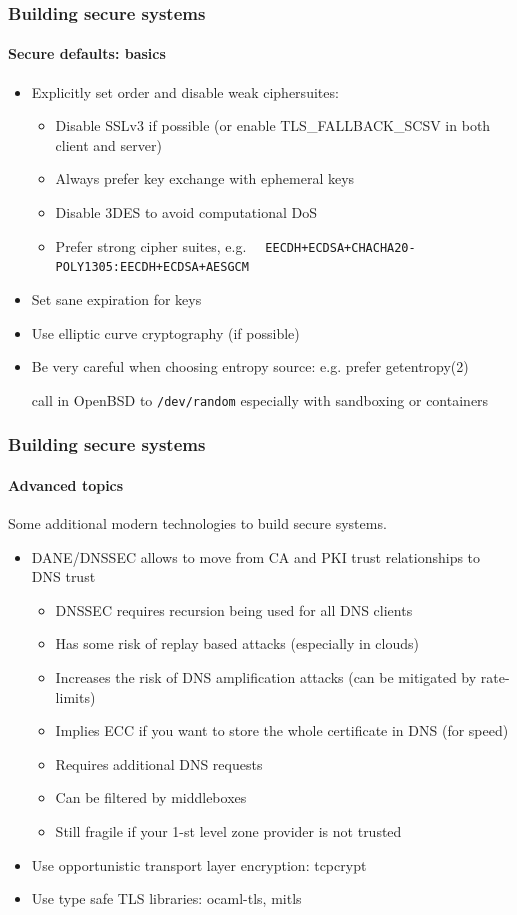 \documentclass[11pt,t]{beamer}
\newcommand{\funcname}[1]{
	{\color{yellow!30} #1}
}
\newcommand{\cipher}[1]{
	{\color{blue!30} #1}
}
\begin{document}
\begin{frame}[fragile]
\frametitle{Building secure systems}
\framesubtitle{Secure defaults: basics}
\begin{itemize}
\item Explicitly set order and disable weak ciphersuites:
	\begin{itemize}
	\item Disable SSLv3 if possible (or enable \funcname{TLS\_FALLBACK\_SCSV} in both 
	client and server)
	\item Always prefer key exchange with ephemeral keys
	\item Disable 3DES to avoid computational DoS
	\item Prefer strong cipher suites, e.g. 
	{\scriptsize 
	\texttt{\cipher{EECDH+ECDSA+CHACHA20-POLY1305:EECDH+ECDSA+AESGCM}}
	}
	\end{itemize}
\item Set sane expiration for keys
\item Use elliptic curve cryptography (if possible)
\item Be very careful when choosing entropy source: e.g. prefer \funcname{getentropy(2)} 
call in OpenBSD to \texttt{/dev/random} especially with sandboxing or containers
\end{itemize}
\end{frame}

\begin{frame}[fragile]
\frametitle{Building secure systems}
\framesubtitle{Advanced topics}
Some additional modern technologies to build secure systems.
\begin{itemize}
\item DANE/DNSSEC allows to move from CA and PKI trust relationships to DNS trust
\begin{itemize}
\item DNSSEC requires recursion being used for all DNS clients
\item Has some risk of replay based attacks (especially in clouds)
\item Increases the risk of DNS amplification attacks (can be mitigated by rate-limits)
\item Implies ECC if you want to store the whole certificate in DNS (for speed)
\item Requires additional DNS requests
\item Can be filtered by middleboxes
\item Still fragile if your 1-st level zone provider is not trusted
\end{itemize}
\item Use opportunistic transport layer encryption: tcpcrypt
\item Use type safe TLS libraries: ocaml-tls, mitls
\end{itemize}
\end{frame}
\end{document}
